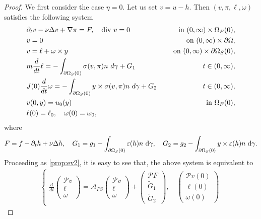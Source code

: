 \documentclass[12pt,a4paper,reqno]{amsart}
\theoremstyle{definition}
\theoremstyle{remark}
\numberwithin{equation}{section}
\newcommand{\oso}{\Omega_{S}(0)}
\newcommand{\ofo}{\Omega_{F}(0)}
\newcommand{\ds}{\displaystyle}
\newcommand{\poso}{\partial\oso}
\newcommand{\mpp}{\mathcal{P}}
\newcommand{\dg}{{\rm d} \gamma}
\begin{document}
\begin{proof}
We first consider the case $\eta = 0.$ Let us set $v = u - h.$ Then $(v,\pi, \ell, \omega)$ satisfies the following system
\begin{alignat}{2} \label{fsi-l-d1}
&\partial_{t} v - \nu \Delta v + \nabla \pi  =  F, \quad \mathrm{div} \ v =   0  & \quad \mbox{ in }  (0,\infty) \times \ofo, \notag \\
& v = 0  & \mbox{ on } (0,\infty) \times \partial\Omega,\notag  \\
&  v  = \ell  + \omega \times y & \quad \mbox{ on }    (0,\infty) \times \poso, \notag \\
&  m\frac{d}{dt} \ell =  -  \int_{\partial \Omega_{S}(0)}  \sigma(v,\pi) n \ d\gamma  +  G_{1} & \quad t \in (0,\infty), \\
&  J(0)\frac{d}{dt} \omega =  - \int_{\partial \Omega_{S}(0)} y \times   \sigma(v,\pi)n \ d\gamma + G_{2} &  \quad t \in (0,\infty), \notag \\
&  v (0,y) = u_{0}(y) & \mbox{ in }  \Omega_{F}(0),  \notag \\
&  \ell(0) = \ell_{0}, \quad  \omega(0) = \omega_{0}, \notag
\end{alignat}
where
\begin{align*}
F = f -  \partial_{t} h + \nu \Delta h, \quad G_{1} = g_{1}  - \int_{\poso} \varepsilon(h)n \ \dg, \quad  G_{2} = g_{2}  - \int_{\poso} y \times \varepsilon(h)n \ \dg.
\end{align*}
Proceeding as \cref{prop:ev2}, it is easy to see that, the above system is equivalent to
\begin{align} \label{eq:55}
\begin{cases}
\ds \frac{d}{dt} \begin{pmatrix}
\mpp v \\ \ell \\ \omega
\end{pmatrix} = \mathcal{A}_{FS}  \begin{pmatrix}
\mpp v \\ \ell \\ \omega
\end{pmatrix} +  \begin{pmatrix}
\mpp F \\ \widetilde G_{1} \\ \widetilde G_{2}
\end{pmatrix}, \quad  \begin{pmatrix}
\mpp v(0) \\ \ell(0) \\ \omega (0)

\end{pmatrix}
\end{cases}
\end{align}
\end{proof}
\end{document}
